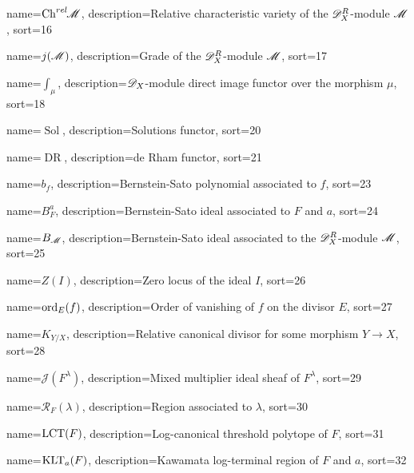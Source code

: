 {
  name={\ensuremath{\Chrel \M}},
  description={Relative characteristic variety of the $\mathscr{D}_X^R$-module $\mathscr{M}$},
  sort=16
}


{
  name={\ensuremath{j(\M)}},
  description={Grade of the $\mathscr{D}_X^R$-module $\mathscr{M}$},
  sort=17
}


{
  name={\ensuremath{\int_\mu}},
  description={$\mathscr{D}_X$-module direct image functor over the morphism $\mu$},
  sort=18
}





{
  name={\ensuremath{\operatorname{Sol}}},
  description={Solutions functor},
  sort=20
}


{
  name={\ensuremath{\operatorname{DR}}},
  description={de Rham functor},
  sort=21
}




{
  name={\ensuremath{b_f}},
  description={Bernstein-Sato polynomial associated to $f$},
  sort=23
}



{
  name={\ensuremath{B_F^a}},
  description={Bernstein-Sato ideal associated to $F$ and $a$},
  sort=24
}


{
  name={\ensuremath{B_\M}},
  description={Bernstein-Sato ideal associated to the  $\mathscr{D}_X^R$-module $\mathscr{M}$},
  sort=25
}


{
  name={\ensuremath{Z(I)}},
  description={Zero locus of the ideal $I$},
  sort=26
}


{
  name={\ensuremath{\ord_E(f)}},
  description={Order of vanishing of $f$ on the divisor $E$},
  sort=27
}


{
  name={\ensuremath{K_{Y/X}}},
  description={Relative canonical divisor for some morphism $Y\to X$},
  sort=28
}


{
  name={\ensuremath{\mathcal{J}(F^\lambda)}},
  description={Mixed multiplier ideal sheaf of $F^\lambda$},
  sort=29
}


{
  name={\ensuremath{\mathcal{R}_F(\lambda)}},
  description={Region associated to $\lambda$},
  sort=30
}


{
  name={\ensuremath{\LCT(F)}},
  description={Log-canonical threshold polytope of $F$},
  sort=31
}


{
  name={\ensuremath{\KLT_a(F)}},
  description={Kawamata log-terminal region of $F$ and $a$},
  sort=32
}

